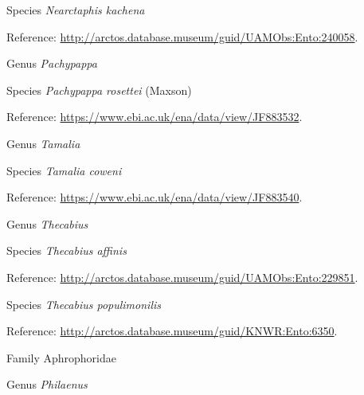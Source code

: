 \documentclass[9pt, article]{memoir}
\begin{document}
\begin{multicols}{2}
\vspace{6pt}\noindent\hspace{36pt}Species \textit{Nearctaphis kachena}


\vspace{6pt}Reference: 
\url{http://arctos.database.museum/guid/UAMObs:Ento:240058}.

\vspace{6pt}\noindent\hspace{30pt}Genus \textit{Pachypappa}


\vspace{6pt}\noindent\hspace{36pt}Species \textit{Pachypappa rosettei} (Maxson)


\vspace{6pt}Reference: 
\url{https://www.ebi.ac.uk/ena/data/view/JF883532}.

\vspace{6pt}\noindent\hspace{30pt}Genus \textit{Tamalia}


\vspace{6pt}\noindent\hspace{36pt}Species \textit{Tamalia coweni}


\vspace{6pt}Reference: 
\url{https://www.ebi.ac.uk/ena/data/view/JF883540}.

\vspace{6pt}\noindent\hspace{30pt}Genus \textit{Thecabius}


\vspace{6pt}\noindent\hspace{36pt}Species \textit{Thecabius affinis}


\vspace{6pt}Reference: 
\url{http://arctos.database.museum/guid/UAMObs:Ento:229851}.

\vspace{6pt}\noindent\hspace{36pt}Species \textit{Thecabius populimonilis}


\vspace{6pt}Reference: 
\url{http://arctos.database.museum/guid/KNWR:Ento:6350}.

\vspace{6pt}\noindent\hspace{24pt}Family Aphrophoridae


\vspace{6pt}\noindent\hspace{30pt}Genus \textit{Philaenus}



\end{multicols}
\end{document}
